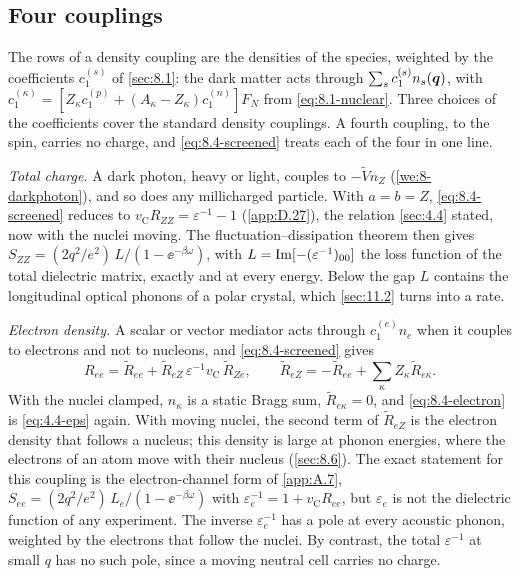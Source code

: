 \subsection{Four couplings}\label{sec:8.4-couplings}

The rows of a density coupling are the densities of the species, weighted by the coefficients $c_1^{(s)}$ of \cref{sec:8.1}: the dark matter acts through $\sum_sc_1^{(s)}n_s(\bm{q})$, with $c_1^{(\kappa)} = [Z_\kappa c_1^{(p)} + (A_\kappa - Z_\kappa)c_1^{(n)}]F_N$ from \cref{eq:8.1-nuclear}. Three choices of the coefficients cover the standard density couplings. A fourth coupling, to the spin, carries no charge, and \cref{eq:8.4-screened} treats each of the four in one line.

\emph{Total charge.} A dark photon, heavy or light, couples to $-\tilde V n_Z$ (\cref{we:8-darkphoton}), and so does any millicharged particle. With $a = b = Z$, \cref{eq:8.4-screened} reduces to $v_{\mathrm{C}}R_{ZZ} = \varepsilon^{-1} - 1$ (\cref{app:D.27}), the relation \cref{sec:4.4} stated, now with the nuclei moving. The fluctuation--dissipation theorem then gives $S_{ZZ} = (2q^2/e^2)\,L/(1 - \ee^{-\beta\omega})$, with $L = \operatorname{Im}[-(\varepsilon^{-1})_{00}]$ the loss function of the total dielectric matrix, exactly and at every energy. Below the gap $L$ contains the longitudinal optical phonons of a polar crystal, which \cref{sec:11.2} turns into a rate.

\emph{Electron density.} A scalar or vector mediator acts through $c_1^{(e)}n_e$ when it couples to electrons and not to nucleons, and \cref{eq:8.4-screened} gives
\begin{equation}
  R_{ee} = \tilde R_{ee} + \tilde R_{eZ}\,\varepsilon^{-1}v_{\mathrm{C}}\,\tilde R_{Ze} , \qquad
  \tilde R_{eZ} = -\tilde R_{ee} + \sum_\kappa Z_\kappa\tilde R_{e\kappa} .
  \label{eq:8.4-electron}
\end{equation}
With the nuclei clamped, $n_\kappa$ is a static Bragg sum, $\tilde R_{e\kappa} = 0$, and \cref{eq:8.4-electron} is \cref{eq:4.4-eps} again. With moving nuclei, the second term of $\tilde R_{eZ}$ is the electron density that follows a nucleus; this density is large at phonon energies, where the electrons of an atom move with their nucleus (\cref{sec:8.6}). The exact statement for this coupling is the electron-channel form of \cref{app:A.7}, $S_{ee} = (2q^2/e^2)\,L_e/(1 - \ee^{-\beta\omega})$ with $\varepsilon_e^{-1} = 1 + v_{\mathrm{C}}R_{ee}$, but $\varepsilon_e$ is not the dielectric function of any experiment. The inverse $\varepsilon_e^{-1}$ has a pole at every acoustic phonon, weighted by the electrons that follow the nuclei. By contrast, the total $\varepsilon^{-1}$ at small $q$ has no such pole, since a moving neutral cell carries no charge.

